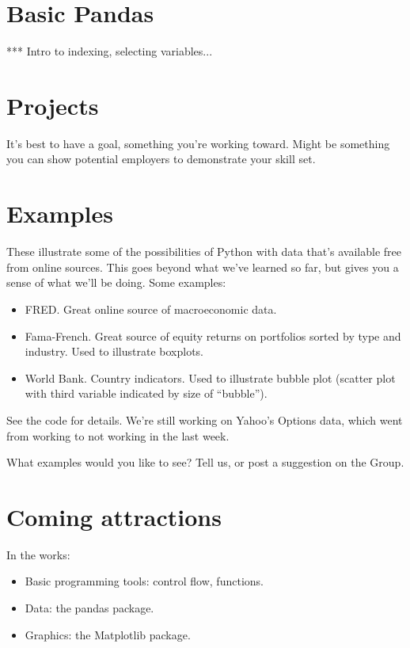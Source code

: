 \documentclass[11pt]{article}
\begin{document}
\section{Basic Pandas}

*** Intro to indexing, selecting variables...


\section{Projects}


It's best to have a goal, something you're working toward.
Might be something you can show potential employers to
demonstrate your skill set.


\section{Examples}

These illustrate some of the possibilities of Python
with data that's available free from online sources.
This goes beyond what we've learned so far, but gives you a sense
of what we'll be doing.
Some examples:
\begin{itemize}
\item FRED.  Great online source of macroeconomic data.
\item Fama-French.  Great source of equity returns on portfolios sorted by type and industry.
Used to illustrate boxplots.
\item World Bank.  Country indicators. Used to illustrate bubble plot (scatter plot with third variable
indicated by size of ``bubble'').
\end{itemize}
See the code for details.
We're still working on Yahoo's Options data,
which went from working to not working in the last week.

What examples would you like to see?
Tell us, or post a suggestion on the Group.


\section{Coming attractions}

In the works:
\begin{itemize}
\item Basic programming tools:  control flow, functions.
\item Data:  the pandas package.
\item Graphics:  the Matplotlib package.
\end{itemize}
\end{document}
